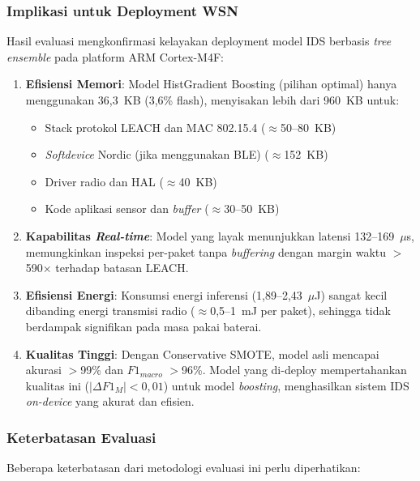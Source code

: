 \subsubsection{Implikasi untuk Deployment WSN}

Hasil evaluasi mengkonfirmasi kelayakan deployment model IDS berbasis \textit{tree ensemble} pada platform ARM Cortex-M4F:

\begin{enumerate}
    \item \textbf{Efisiensi Memori}: Model HistGradient Boosting (pilihan optimal) hanya menggunakan 36,3~KB (3,6\% flash), menyisakan lebih dari 960~KB untuk:
    \begin{itemize}
        \item Stack protokol LEACH dan MAC 802.15.4 ($\approx$50--80~KB)
        \item \textit{Softdevice} Nordic (jika menggunakan BLE) ($\approx$152~KB)
        \item Driver radio dan HAL ($\approx$40~KB)
        \item Kode aplikasi sensor dan \textit{buffer} ($\approx$30--50~KB)
    \end{itemize}

    \item \textbf{Kapabilitas \textit{Real-time}}: Model yang layak menunjukkan latensi 132--169~$\mu$s, memungkinkan inspeksi per-paket tanpa \textit{buffering} dengan margin waktu $>$590$\times$ terhadap batasan LEACH.

    \item \textbf{Efisiensi Energi}: Konsumsi energi inferensi (1,89--2,43~$\mu$J) sangat kecil dibanding energi transmisi radio ($\approx$0,5--1~mJ per paket), sehingga tidak berdampak signifikan pada masa pakai baterai.

    \item \textbf{Kualitas Tinggi}: Dengan Conservative SMOTE, model asli mencapai akurasi $>$99\% dan $F1_{macro}$ $>$96\%. Model yang di-deploy mempertahankan kualitas ini ($|\Delta F1_M| < 0{,}01$) untuk model \textit{boosting}, menghasilkan sistem IDS \textit{on-device} yang akurat dan efisien.
\end{enumerate}

\subsubsection{Keterbatasan Evaluasi}

Beberapa keterbatasan dari metodologi evaluasi ini perlu diperhatikan:


